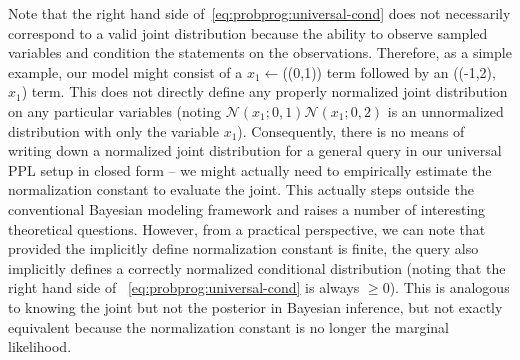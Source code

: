 Note that the right hand side of~\eqref{eq:probprog:universal-cond} does not necessarily
correspond to a valid joint distribution because the ability to observe sampled variables and
condition the \sample statements on the observations.  Therefore, as a simple example, our model
might consist of a $x_1 \leftarrow$\sample(\normal(0,1)) term followed by an \observe(\normal(-1,2),~$x_1$)
term.  This does not directly define any properly normalized joint distribution on any particular variables
(noting $\mathcal{N}(x_1;0,1) \mathcal{N}(x_1;0,2)$ is an unnormalized distribution with only the variable
$x_1$).  Consequently, there is no means of writing down a normalized joint distribution for a general
query in our universal PPL setup in closed form -- we might actually need to empirically estimate
the normalization constant to evaluate the joint.  This actually steps outside the conventional Bayesian
modeling framework and raises a number of interesting theoretical questions.  However, from a
practical perspective, we can note that provided the implicitly define normalization constant is finite,
the query also implicitly defines a correctly normalized conditional distribution (noting that the right
hand side of ~\eqref{eq:probprog:universal-cond} is always $\ge0$).
This is analogous to knowing the joint but not the posterior in Bayesian inference, but not exactly
equivalent because the normalization constant is no longer the marginal likelihood.

